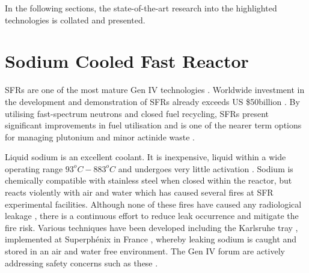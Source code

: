 \documentclass[journal]{IEEEtran}
\begin{document}
In the following sections, the state-of-the-art research into the highlighted technologies is collated and presented.


\section{Sodium Cooled Fast Reactor}
SFRs are one of the most mature Gen IV technologies \cite{Marques2010a}. 
Worldwide investment in the development and demonstration of SFRs already exceeds US \$50billion \cite{Int2012}. 
By utilising fast-spectrum neutrons and closed fuel recycling, SFRs present significant improvements in fuel utilisation and is one of the nearer term options for managing plutonium and minor actinide waste \cite{GenIVForum}.

Liquid sodium is an excellent coolant. 
It is inexpensive, liquid within a wide operating range $93^{o}C-883^{o}C$ and undergoes very little activation \cite{Sakamoto2013194}. 
Sodium is chemically compatible with stainless steel when closed within the reactor, but reacts violently with air and water \cite{Int2012, Sakamoto2013194} which has caused several fires at SFR experimental facilities.
Although none of these fires have caused any radiological leakage \cite{Int2012}, there is a continuous effort to reduce leak occurrence and mitigate the fire risk. 
Various techniques have been developed including the Karlsruhe tray \cite{Huber1975155}, implemented at Superph\'{e}nix in France \cite{Int2012}, whereby leaking sodium is caught and stored in an air and water free environment. 
The Gen IV forum are actively addressing safety concerns such as these \cite{GenIVRoadmap}.
\end{document}
